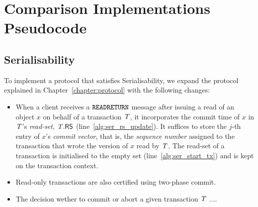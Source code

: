 \cleardoublepage
\chapter{Comparison Implementations Pseudocode}
\label{appendix:code}


\section{Serialisability}
\label{appendix:ser}




To implement a protocol that satisfies Serialisability, we expand the protocol explained in Chapter~\ref{chapter:protocol} with the following changes:

\begin{itemize}
  \item When a client receives a ${\tt READRETURN}$ message after issuing a read of an object $x$ on behalf of a transaction $\mathit{T}$, it incorporates the commit time of $x$ in $\mathit{T}$'s \emph{read-set}, $\mathit{T}.\mathsf{RS}$ (line~\ref{alg:ser_rs_update}). It suffices to store the $j$-th entry of $x$'s \emph{commit vector}, that is, the \emph{sequence number} assigned to the transaction that wrote the version of $x$ read by $\mathit{T}$. The read-set of a transaction is initialised to the empty set (line~\ref{alg:ser_start_tx}) and is kept on the transaction context.
  \item Read-only transactions are also certified using two-phase commit.
  \item The decision wether to commit or abort a given transaction $\mathit{T}$ ....
\end{itemize}

